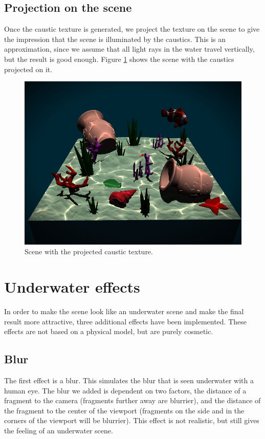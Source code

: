 \documentclass{article}
\begin{document}
\subsection{Projection on the scene}
Once the caustic texture is generated, we project the texture on the scene to give the 
impression that the scene is illuminated by the caustics. This is an approximation, 
since we assume that all light rays in the water travel vertically, but the result is good enough. 
Figure \ref{fig:scene_with_caustics} shows the scene with the caustics projected on it.

\vspace{-0.5em}
\begin{figure}[h]
    \centering
    \includegraphics[width=\columnwidth]{imgs/scene_with_caustics.png}
    \caption{Scene with the projected caustic texture.}
    \label{fig:scene_with_caustics}
\end{figure}

\section{Underwater effects}
\label{sec:underwater}

In order to make the scene look like an underwater scene and make the final result more attractive, three additional effects have been implemented. These effects are not based on a physical model, but are purely cosmetic. 

\subsection{Blur}
The first effect is a blur. This simulates the blur that is seen underwater with a human eye. The blur we added is dependent on two factors, the distance of a fragment to the camera (fragments further away are blurrier), and the distance of the fragment to the center of the viewport (fragments on the side and in the corners of the viewport will be blurrier). This effect is not realistic, but still gives the feeling of an underwater scene.
\end{document}
